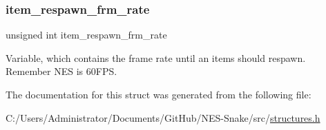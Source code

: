 \subsubsection{\texorpdfstring{item\+\_\+respawn\+\_\+frm\+\_\+rate}{item\_respawn\_frm\_rate}}
{\footnotesize\ttfamily unsigned int item\+\_\+respawn\+\_\+frm\+\_\+rate}

Variable, which contains the frame rate until an items should respawn. Remember N\+ES is 60\+F\+PS. 

The documentation for this struct was generated from the following file\+:\begin{DoxyCompactItemize}
\item 
C\+:/\+Users/\+Administrator/\+Documents/\+Git\+Hub/\+N\+E\+S-\/\+Snake/src/\hyperlink{structures_8h}{structures.\+h}\end{DoxyCompactItemize}
